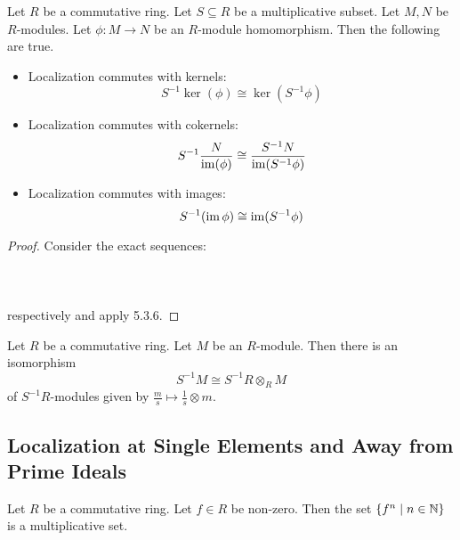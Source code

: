 \documentclass[a4paper]{article}
\begin{document}
\begin{lmm}{}{} Let $R$ be a commutative ring. Let $S\subseteq R$ be a multiplicative subset. Let $M,N$ be $R$-modules. Let $\phi:M\to N$ be an $R$-module homomorphism. Then the following are true. 
\begin{itemize}
\item Localization commutes with kernels: $$S^{-1}\ker(\phi)\cong\ker(S^{-1}\phi)$$
\item Localization commutes with cokernels: $$S^{-1}\frac{N}{\operatorname{im}(\phi)}\cong\frac{S^{-1}N}{\operatorname{im}(S^{-1}\phi)}$$
\item Localization commutes with images: $$S^{-1}(\operatorname{im}\phi)\cong\operatorname{im}(S^{-1}\phi)$$
\end{itemize} 
\begin{proof}
Consider the exact sequences: \\~\\
\\~\\
respectively and apply 5.3.6. 
\end{proof}
\end{lmm}

\begin{prp}{}{} Let $R$ be a commutative ring. Let $M$ be an $R$-module. Then there is an isomorphism $$S^{-1}M\cong S^{-1}R\otimes_RM$$ of $S^{-1}R$-modules given by $\frac{m}{s}\mapsto\frac{1}{s}\otimes m$. 
\end{prp}

\subsection{Localization at Single Elements and Away from Prime Ideals}
\begin{lmm}{}{} Let $R$ be a commutative ring. Let $f\in R$ be non-zero. Then the set $\{f^n\;|\;n\in\mathbb{N}\}$ is a multiplicative set. 
\end{lmm}
\end{document}
